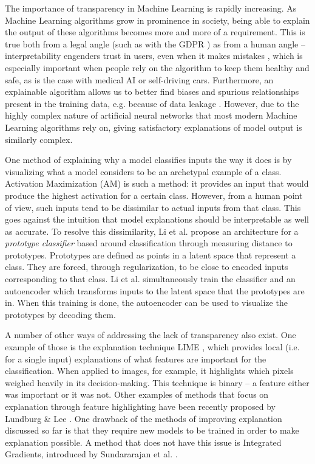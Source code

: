 The importance of transparency in Machine Learning is rapidly increasing. As Machine Learning algorithms grow in prominence in society, being able to explain the output of these algorithms becomes more and more of a requirement. This is true both from a legal angle (such as with the GDPR \citep{gdprart}) as from a human angle -- interpretability engenders trust in users, even when it makes mistakes \citep{automtrust}, which is especially important when people rely on the algorithm to keep them healthy and safe, as is the case with medical AI or self-driving cars. Furthermore, an explainable algorithm allows us to better find biases and spurious relationships present in the training data, e.g. because of data leakage \citep{dataleakage}. However, due to the highly complex nature of artificial neural networks that most modern Machine Learning algorithms rely on, giving satisfactory explanations of model output is similarly complex.

One method of explaining why a model classifies inputs the way it does is by visualizing what a model considers to be an archetypal example of a class. Activation Maximization (AM) \citep{activationmaximization} is such a method: it provides an input that would produce the highest activation for a certain class. However, from a human point of view, such inputs tend to be dissimilar to actual inputs from that class. This goes against the intuition that model explanations should be interpretable as well as accurate. To resolve this dissimilarity, Li et al. \citep{li2018deep} propose an architecture for a \textit{prototype classifier} based around classification through measuring distance to prototypes. Prototypes are defined as points in a latent space that represent a class. They are forced, through regularization, to be close to encoded inputs corresponding to that class. Li et al. simultaneously train the classifier and an autoencoder \citep{autoencoderpaper} which transforms inputs to the latent space that the prototypes are in. When this training is done, the autoencoder can be used to visualize the prototypes by decoding them.

A number of other ways of addressing the lack of transparency also exist. One example of those is the explanation technique LIME \citep{LIME}, which provides local (i.e. for a single input) explanations of what features are important for the classification. When applied to images, for example, it highlights which pixels weighed heavily in its decision-making. This technique is binary -- a feature either was important or it was not. Other examples of methods that focus on explanation through feature highlighting have been recently proposed by Lundburg \& Lee \citep{featureexamplepaper1}. One drawback of the methods of improving explanation discussed so far is that they require new models to be trained in order to make explanation possible. A method that does not have this issue is Integrated Gradients, introduced by Sundararajan et al. \citep{axioms}.

